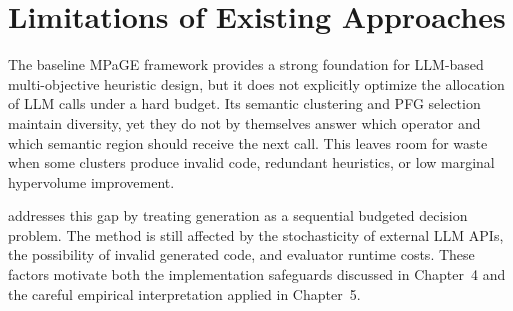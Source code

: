 \documentclass[../main.tex]{subfiles}
\begin{document}


\section{Limitations of Existing Approaches}

The baseline MPaGE framework provides a strong foundation for LLM-based multi-objective heuristic design, but it does not explicitly optimize the allocation of LLM calls under a hard budget. Its semantic clustering and PFG selection maintain diversity, yet they do not by themselves answer which operator and which semantic region should receive the next call. This leaves room for waste when some clusters produce invalid code, redundant heuristics, or low marginal hypervolume improvement.

\bmab{} addresses this gap by treating generation as a sequential budgeted decision problem. The method is still affected by the stochasticity of external LLM APIs, the possibility of invalid generated code, and evaluator runtime costs. These factors motivate both the implementation safeguards discussed in Chapter~4 and the careful empirical interpretation applied in Chapter~5.
\end{document}
